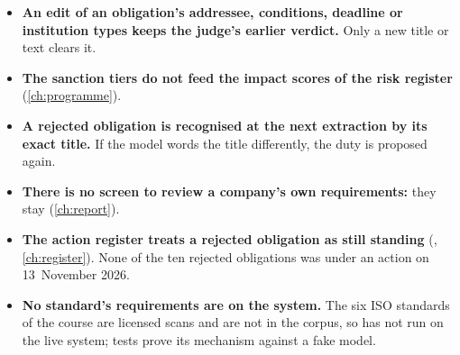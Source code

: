 \begin{itemize}
{    the tiers themselves cannot be viewed there.} The act's page shows whom the scope reading
    names and how many tiers were read, each with the model's note, and no more. Sanction
    provisions can be read again by the operator's command; no command
    reads a scope again, so a scope reading stays until its act gets a new version.
  \item \textbf{An edit of an obligation's addressee, conditions, deadline or institution
    types keeps the judge's earlier verdict.} Only a new title or text clears it.
  \item \textbf{The sanction tiers do not feed the impact scores of the risk register}
    (\cref{ch:programme}).
  \item \textbf{A rejected obligation is recognised at the next extraction by its exact
    title.} If the model words the title differently, the duty is proposed again.
  \item \textbf{There is no screen to review a company's own requirements:} they stay
     (\cref{ch:report}).
  \item \textbf{The action register treats a rejected obligation as still standing}
    (, \cref{ch:register}). None of the ten rejected obligations
    was under an action on 13~November 2026.
  \item \textbf{No standard's requirements are on the system.} The six ISO standards of the
    course are licensed scans and are not in the corpus, so
     has not run on the live system; tests prove its
    mechanism against a fake model.
\end{itemize}
